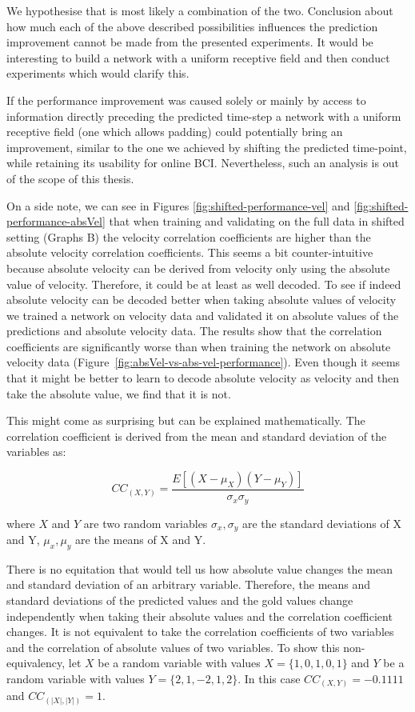 We hypothesise that is most likely a combination of the two.
Conclusion about how much each of the above described possibilities influences the prediction improvement cannot be made from the presented experiments.
It would be interesting to build a network with a uniform receptive field and then conduct experiments which would clarify this.

If the performance improvement was caused solely or mainly by access to information directly preceding the predicted time-step a network with a uniform receptive field (one which allows padding) could potentially bring an improvement, similar to the one we achieved by shifting the predicted time-point, while retaining its usability for online BCI.
Nevertheless, such an analysis is out of the scope of this thesis.

On a side note, we can see in Figures \ref{fig:shifted-performance-vel} and \ref{fig:shifted-performance-absVel} that when training and validating on the full data in shifted setting (Graphs B) the velocity correlation coefficients are higher than the absolute velocity correlation coefficients. 
This seems a bit counter-intuitive because absolute velocity can be derived from velocity only using the absolute value of velocity. 
Therefore, it could be at least as well decoded.
To see if indeed absolute velocity can be decoded better when taking absolute values of velocity we trained a network on velocity data and validated it on absolute values of the predictions and absolute velocity data.
The results show that the correlation coefficients are significantly worse than when training the network on absolute velocity data (Figure~\ref{fig:absVel-vs-abs-vel-performance}). Even though it seems that it might be better to learn to decode absolute velocity as velocity and then take the absolute value, we find that it is not. 

This might come as surprising but can be explained mathematically. The correlation coefficient is derived from the mean and standard deviation of the variables as:

\begin{equation}
    CC_{(X, Y)}= \frac{E[(X - \mu_X)(Y - \mu_Y)] }{\sigma_x \sigma_y}
    \label{eq:correlation}
\end{equation}

where $X$ and $Y$ are two random variables $\sigma_x, \sigma_y$ are the standard deviations of X and Y, $ \mu_x, \mu_y$ are the means of X and Y.

There is no equitation that would tell us how absolute value changes the mean and standard deviation of an arbitrary variable. Therefore, the means and standard deviations of the predicted values and the gold values change independently when taking their absolute values and the correlation coefficient changes.
It is not equivalent to take the correlation coefficients of two variables and the correlation of absolute values of two variables. 
To show this non-equivalency, let $X$ be a random variable with values $X = \{1, 0, 1, 0, 1\} $ and $Y$ be a random variable with values $Y = \{2, 1, -2, 1, 2\}$. In this case $CC_{(X,Y)} = -0.1111$ and $CC_{(|X|,|Y|)} = 1$.

